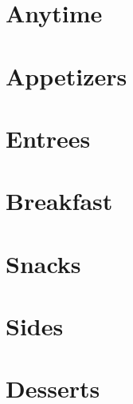 \documentclass{book}
\begin{document}
\tableofcontents
\chapter{Anytime}




\chapter{Appetizers}


\chapter{Entrees}


\chapter{Breakfast}


\chapter{Snacks}

\chapter{Sides}

\chapter{Desserts}



\clearpage

\end{document}
